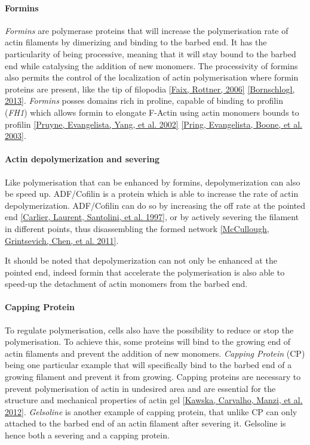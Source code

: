 \documentclass[A4paperpaper,11pt,english]{sphinxmanual}
\begin{document}
\paragraph{Formins}
\label{parts/part1:formins}
\emph{Formins} are polymerase proteins that will increase the polymerisation rate
of actin filaments by dimerizing and binding to the barbed end. It has the
particularity of being processive, meaning that it will stay bound to the
barbed end while catalysing the addition of new monomers. The processivity of
formins also permits the control of the localization of actin polymerisation
where formin proteins are present, like the tip of filopodia {\hyperref[parts/part1:faix2006]{{[}Faix, Rottner,  2006{]}}}
{\hyperref[parts/part1:bornschlogl2013]{{[}Bornschlogl,  2013{]}}}. \emph{Formins} posses domains rich in proline, capable of
binding to profilin (\emph{FH1}) which allows formin to elongate F-Actin using actin
monomers bounds to profilin {\hyperref[parts/part1:pruyne2002]{{[}Pruyne, Evangelista, Yang,  et al.  2002{]}}} {\hyperref[parts/part1:pring2003a]{{[}Pring, Evangelista, Boone,  et al.  2003{]}}}.


\paragraph{Actin depolymerization and severing}
\label{parts/part1:actin-depolymerization-and-severing}
Like polymerisation that can be enhanced by formins, depolymerization can also
be speed up. ADF/Cofilin is a protein which is able to increase the rate of
actin depolymerization. ADF/Cofilin can do so by increasing the off rate at
the pointed end {\hyperref[parts/part1:carlier1997]{{[}Carlier, Laurent, Santolini,  et al.  1997{]}}}, or by actively severing the filament in
different points, thus disassembling the formed network {\hyperref[parts/part1:mccullough2011]{{[}McCullough, Grintsevich, Chen,  et al.  2011{]}}}.

It should be noted that depolymerization can not only be  enhanced at the
pointed end, indeed formin that accelerate the polymerisation is also able to
speed-up the detachment of actin monomers from the barbed end.


\paragraph{Capping Protein}
\label{parts/part1:capping-protein}
To regulate polymerisation, cells also have the possibility to reduce or stop
the polymerisation. To achieve this, some proteins will bind to the growing end
of actin filaments and prevent the addition of new monomers.  \emph{Capping Protein}
(CP) being one particular example that will specifically bind to the barbed end
of a growing filament and  prevent it from growing. Capping proteins are
necessary to prevent polymerisation of actin in undesired area
and are essential for the structure and mechanical properties of actin gel
{\hyperref[parts/part1:kawska2012]{{[}Kawska, Carvalho, Manzi,  et al.  2012{]}}}. \emph{Gelsoline} is another example of capping protein, that
unlike CP can only attached to the barbed end of an actin filament after
severing it. Gelsoline is hence both a severing and a capping protein.
\end{document}
